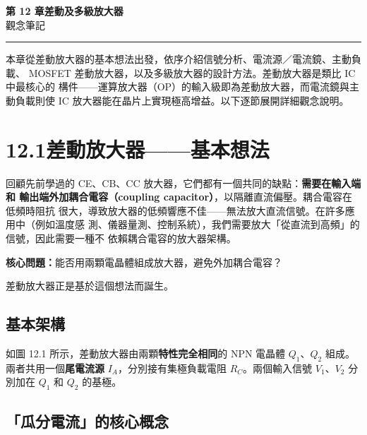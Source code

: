 \documentclass[12pt]{article}
\begin{document}
\begin{center}
{\Huge\bfseries\color{maincol} 第 12 章\quad 差動及多級放大器}\\[0.5em]
{\large\color{keycol} 觀念筆記}
\end{center}
\vspace{0.4em}\hrule\vspace{1.2em}

\noindent
本章從差動放大器的基本想法出發，依序介紹信號分析、電流源／電流鏡、主動負載、
MOSFET 差動放大器，以及多級放大器的設計方法。差動放大器是類比 IC 中最核心的
構件——運算放大器（OP）的輸入級即為差動放大器，而電流鏡與主動負載則使 IC
放大器能在晶片上實現極高增益。以下逐節展開詳細觀念說明。

\section*{12.1\quad 差動放大器——基本想法}

\begin{keybox}[為什麼需要差動放大器？]
回顧先前學過的 CE、CB、CC 放大器，它們都有一個共同的缺點：\textbf{需要在輸入端和
輸出端外加耦合電容（coupling capacitor）}，以隔離直流偏壓。耦合電容在低頻時阻抗
很大，導致放大器的低頻響應不佳——無法放大直流信號。在許多應用中（例如溫度感
測、儀器量測、控制系統），我們需要放大「從直流到高頻」的信號，因此需要一種不
依賴耦合電容的放大器架構。

\medskip
\textbf{核心問題：}能否用兩顆電晶體組成放大器，避免外加耦合電容？

差動放大器正是基於這個想法而誕生。
\end{keybox}

\subsection*{基本架構}


如圖 12.1 所示，差動放大器由兩顆\textbf{特性完全相同}的 NPN 電晶體 $Q_1$、$Q_2$ 組成。
兩者共用一個\textbf{尾電流源} $I_A$，分別接有集極負載電阻 $R_C$。兩個輸入信號 $V_1$、$V_2$
分別加在 $Q_1$ 和 $Q_2$ 的基極。

\subsection*{「瓜分電流」的核心概念}
\end{document}
